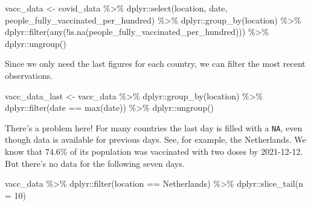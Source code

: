 \documentclass[
]{book}
\newenvironment{Shaded}{\begin{snugshade}}{\end{snugshade}}
\newcommand{\AttributeTok}[1]{\textcolor[rgb]{0.77,0.63,0.00}{#1}}
\newcommand{\DecValTok}[1]{\textcolor[rgb]{0.00,0.00,0.81}{#1}}
\newcommand{\FunctionTok}[1]{\textcolor[rgb]{0.00,0.00,0.00}{#1}}
\newcommand{\NormalTok}[1]{#1}
\newcommand{\OtherTok}[1]{\textcolor[rgb]{0.56,0.35,0.01}{#1}}
\newcommand{\SpecialCharTok}[1]{\textcolor[rgb]{0.00,0.00,0.00}{#1}}
\newcommand{\StringTok}[1]{\textcolor[rgb]{0.31,0.60,0.02}{#1}}
\begin{document}
\begin{Shaded}
\begin{Highlighting}[]
\NormalTok{vacc\_data }\OtherTok{\textless{}{-}}\NormalTok{ covid\_data }\SpecialCharTok{\%\textgreater{}\%} 
\NormalTok{  dplyr}\SpecialCharTok{::}\FunctionTok{select}\NormalTok{(location, }
\NormalTok{                date, }
\NormalTok{                people\_fully\_vaccinated\_per\_hundred) }\SpecialCharTok{\%\textgreater{}\%}   
\NormalTok{  dplyr}\SpecialCharTok{::}\FunctionTok{group\_by}\NormalTok{(location) }\SpecialCharTok{\%\textgreater{}\%} 
\NormalTok{  dplyr}\SpecialCharTok{::}\FunctionTok{filter}\NormalTok{(}\FunctionTok{any}\NormalTok{(}\SpecialCharTok{!}\FunctionTok{is.na}\NormalTok{(people\_fully\_vaccinated\_per\_hundred))) }\SpecialCharTok{\%\textgreater{}\%} 
\NormalTok{  dplyr}\SpecialCharTok{::}\FunctionTok{ungroup}\NormalTok{()}
\end{Highlighting}
\end{Shaded}

Since we only need the last figures for each country, we can filter the most recent observations.

\begin{Shaded}
\begin{Highlighting}[]
\NormalTok{vacc\_data\_last }\OtherTok{\textless{}{-}}\NormalTok{ vacc\_data }\SpecialCharTok{\%\textgreater{}\%} 
\NormalTok{  dplyr}\SpecialCharTok{::}\FunctionTok{group\_by}\NormalTok{(location) }\SpecialCharTok{\%\textgreater{}\%} 
\NormalTok{  dplyr}\SpecialCharTok{::}\FunctionTok{filter}\NormalTok{(date }\SpecialCharTok{==} \FunctionTok{max}\NormalTok{(date)) }\SpecialCharTok{\%\textgreater{}\%} 
\NormalTok{  dplyr}\SpecialCharTok{::}\FunctionTok{ungroup}\NormalTok{()}
\end{Highlighting}
\end{Shaded}

There's a problem here! For many countries the last day is filled with a \texttt{NA}, even though data is available for previous days. See, for example, the Netherlands. We know that 74.6\% of its population was vaccinated with two doses by 2021-12-12. But there's no data for the following seven days.

\begin{Shaded}
\begin{Highlighting}[]
\NormalTok{vacc\_data }\SpecialCharTok{\%\textgreater{}\%}
\NormalTok{  dplyr}\SpecialCharTok{::}\FunctionTok{filter}\NormalTok{(location }\SpecialCharTok{==} \StringTok{\textquotesingle{}Netherlands\textquotesingle{}}\NormalTok{) }\SpecialCharTok{\%\textgreater{}\%} 
\NormalTok{  dplyr}\SpecialCharTok{::}\FunctionTok{slice\_tail}\NormalTok{(}\AttributeTok{n =} \DecValTok{10}\NormalTok{)}
\end{Highlighting}
\end{Shaded}
\end{document}
